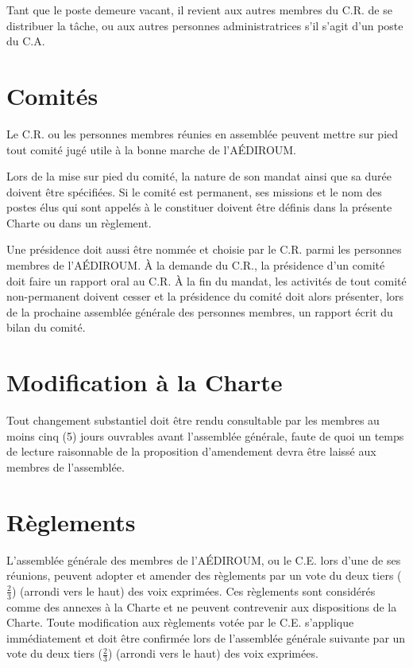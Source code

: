 \documentclass{aediroum}
\begin{document}
Tant que le poste demeure vacant, il revient aux autres membres du C.R. de se distribuer la tâche, ou aux autres personnes administratrices s'il s'agit d'un poste du C.A.

\section{Comités}\label{sec:comites}

Le C.R. ou les personnes membres réunies en assemblée peuvent mettre sur pied tout comité jugé utile à la bonne marche de l'AÉDIROUM.

Lors de la mise sur pied du comité, la nature de son mandat ainsi que sa durée doivent être spécifiées. Si le comité est permanent, ses missions et le nom des postes élus qui sont appelés à le constituer doivent être définis dans la présente Charte ou dans un règlement.

Une présidence doit aussi être nommée et choisie par le C.R. parmi les personnes membres de l'AÉDIROUM. À la demande du C.R., la présidence d'un comité doit faire un rapport oral au C.R. À la fin du mandat, les activités de tout comité non-permanent
doivent cesser et la présidence du comité doit alors présenter, lors de la prochaine assemblée générale des personnes membres, un rapport écrit du bilan du comité.

\section{Modification à la Charte}\label{sec:modification-a-la-Charte}

Tout changement substantiel doit être rendu consultable par les membres au moins
cinq (5) jours ouvrables avant l’assemblée générale, faute de quoi un temps de lecture
raisonnable de la proposition d’amendement devra être laissé aux membres de l’assemblée.

\section{Règlements}
\label{sec:reglements}
L’assemblée générale des membres de l’AÉDIROUM, ou le C.E. lors d’une de ses réunions, peuvent adopter et amender des règlements par un vote du deux tiers ($\frac{2}{3}$) (arrondi vers le haut) des voix exprimées. Ces règlements sont considérés comme des annexes à la Charte et ne peuvent contrevenir aux dispositions de la Charte. Toute modification aux règlements votée par le C.E. s’applique immédiatement et doit être confirmée lors de l’assemblée générale suivante par un vote du deux tiers ($\frac{2}{3}$) (arrondi vers le haut) des voix exprimées.
\end{document}
